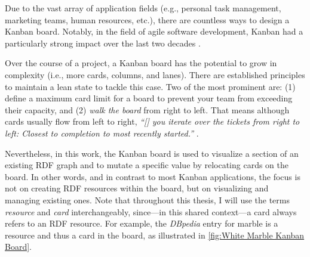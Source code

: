 Due to the vast array of application fields (e.g., personal task management, marketing teams, human resources, etc.), there are countless ways to design a Kanban board. Notably, in the field of agile software development, Kanban had a particularly strong impact over the last two decades \parencite[11]{Stoica2016}.

Over the course of a project, a Kanban board has the potential to grow in complexity (i.e., more cards, columns, and lanes). There are established principles to maintain a lean state to tackle this case. Two of the most prominent are: (1) define a maximum card limit for a board to prevent your team from exceeding their capacity, and (2) \textit{walk the board} from right to left. That means although cards usually flow from left to right, \textit{“[\textellipsis{}] you iterate over the tickets from right to left: Closest to completion to most recently started.”} \parencite{Anderson2016}. 

Nevertheless, in this work, the Kanban board is used to visualize a section of an existing \acrshort*{RDF} graph and to mutate a specific value by relocating cards on the board. In other words, and in contrast to most Kanban applications, the focus is not on creating \acrshort*{RDF} resources within the board, but on visualizing and managing existing ones. Note that throughout this thesis, I will use the terms \textit{resource} and \textit{card} interchangeably, since---in this shared context---a card always refers to an \acrshort*{RDF} resource. For example, the \textit{DBpedia} entry for marble is a resource and thus a card in the board, as illustrated in \autoref{fig:White Marble Kanban Board}.


